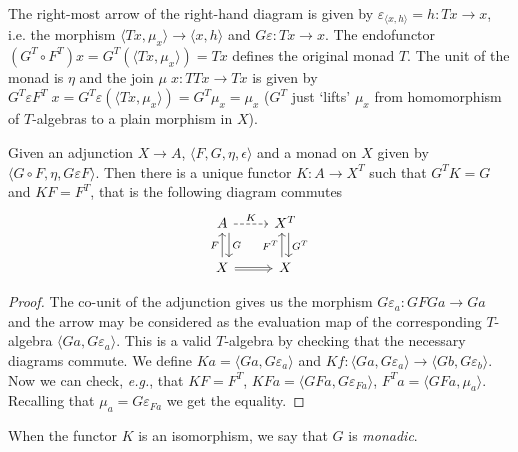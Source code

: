 \documentclass[acmsmall,screen, nonacm, anonymous]{acmart}
\begin{document}
\begin{theorem}
\[\begin{tikzcd}
\end{tikzcd}
\]
The right-most arrow of the right-hand diagram is given by $\varepsilon_{\langle x, h \rangle} = h : Tx \to x$, i.e. the morphism $\langle Tx, \mu_{x} \rangle \to \langle x, h \rangle$ and $G\varepsilon : Tx \to x$.
The endofunctor $(G^{T} \circ F^{T})x = G^{T}(\langle Tx, \mu_{x} \rangle) = Tx$ defines the original monad $T$.
The unit of the monad is $\eta$ and the join $\mu\;x : TTx \to Tx$ is given by $G^{T}\varepsilon F^{T}\;x = G^{T}\varepsilon(\langle Tx, \mu_{x}\rangle) = G^{T}\mu_{x} = \mu_{x}$ ($G^{T}$ just `lifts' $\mu_{x}$ from homomorphism of $T$-algebras to a plain morphism in $X$).
\end{theorem}

\begin{theorem}

Given an adjunction $X \to A$, $\langle F, G, \eta, \epsilon \rangle$ and a monad on $X$ given by $\langle G \circ F, \eta, G\varepsilon F \rangle$.
Then there is a unique functor $K : A \to X^{T}$ such that $G^{T}K = G$ and $KF = F^{T}$, that is the following diagram commutes
\[
\begin{tikzcd}
        A \arrow[r, "K", dashed] \arrow[d, "G", shift left=2] & X^{T} \arrow[d, "G^{T}", shift left] \\
        X \arrow[u, "F"] \arrow[r, no head, Rightarrow]       & X \arrow[u, "F^{T}", shift left]    
\end{tikzcd}
\]
\end{theorem}
\begin{proof}
 The co-unit of the adjunction gives us the morphism $G\varepsilon_{a} : GFGa \to Ga$ and the arrow may be considered as the evaluation map of the corresponding $T$-algebra $\langle Ga, G\varepsilon_{a} \rangle$.
 This is a valid $T$-algebra by checking that the necessary diagrams commute.
 We define $Ka = \langle Ga, G\varepsilon_{a} \rangle$ and $Kf : \langle Ga, G\varepsilon_{a} \rangle \to \langle Gb, G\varepsilon_{b} \rangle$.
 Now we can check, \textit{e.g.}, that $KF = F^{T}$, $KFa = \langle GFa, G\varepsilon_{Fa} \rangle$, $F^{T}a = \langle GFa, \mu_{a}\rangle$. Recalling that $\mu_{a} = G\varepsilon_{Fa}$ we get the equality.
\end{proof}

\begin{definition}

When the functor $K$ is an isomorphism, we say that $G$ is \textit{monadic}.
\end{definition}
\end{document}
